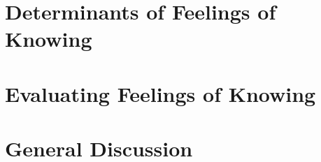\documentclass[10pt,letterpaper]{article}
\begin{document}
\section{Determinants of Feelings of Knowing}

\section{Evaluating Feelings of Knowing}

\section{General Discussion}


%



\setlength{\bibleftmargin}{.125in}
\setlength{\bibindent}{-\bibleftmargin}


\end{document}
